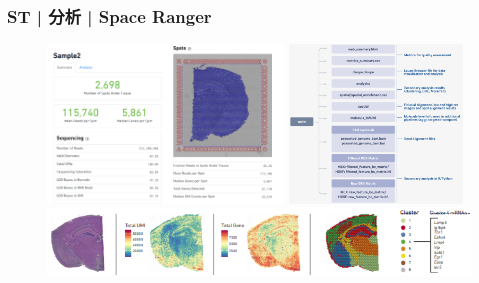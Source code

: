 \documentclass[11pt]{ctexbeamer}
\begin{document}
\begin{frame}
	\frametitle{ST | 分析 | Space Ranger}
	\begin{figure}
		\includegraphics[width=0.56\textwidth]{ST_spaceranger_01.png}
		\includegraphics[width=0.41\textwidth]{ST_spaceranger_03.png}\\
		\vspace{0.5em}
		\includegraphics[width=\textwidth]{ST_spaceranger_05.png}
	\end{figure}
\end{frame}
\end{document}
